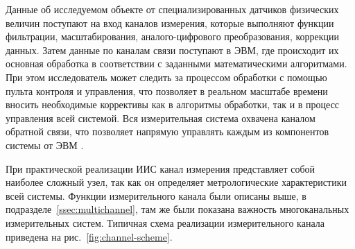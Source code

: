 \documentclass[a4paper, 14pt, titlepage]{extarticle}
\newenvironment{myfigure}[2]%
    {\pushQED{\caption{#1} \label{#2}} %
     \begin{figure}[!htb]\centering } %
    {  \popQED %
     \end{figure}}
\begin{document}
  Данные об исследуемом объекте от специализированных датчиков физических величин
  поступают на вход каналов измерения, которые выполняют функции фильтрации, масштабирования,
  аналого-цифрового преобразования, коррекции данных. Затем данные по каналам связи поступают в
  ЭВМ, где происходит их основная обработка в соответствии с заданными математическими алгоритмами.
  При этом исследователь может следить за процессом обработки с помощью пульта контроля и управления, что
  позволяет в реальном масштабе времени вносить необходимые коррективы как в алгоритмы обработки,
  так и в процесс управления всей системой. Вся измерительная система охвачена каналом
  обратной связи, что позволяет напрямую управлять каждым из компонентов системы от ЭВМ
  \cite{kuzmichev-automation}.

  При практической реализации ИИС канал измерения представляет собой
  наиболее сложный узел, так как он определяет метрологические характеристики всей системы.
  Функции измерительного канала были описаны выше, в подразделе~\ref{ssec:multichannel},
  там же были показана важность многоканальных измерительных систем.
  Типичная схема реализации измерительного канала приведена на рис.~\ref{fig:channel-scheme}.

  \begin{myfigure}{Функциональная схема канала измерения}{fig:channel-scheme}
  \end{myfigure}
\end{document}
